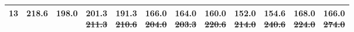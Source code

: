 \begin{tabular}{rccccccccccc}
13 & 218.6 & 198.0 & \shortstack{\textbf{201.3}\\{\tiny\sout{211.3}}} & \shortstack{\textbf{191.3}\\{\tiny\sout{210.6}}} & \shortstack{\textbf{166.0}\\{\tiny\sout{204.0}}} & \shortstack{\textbf{164.0}\\{\tiny\sout{203.3}}} & \shortstack{\textbf{160.0}\\{\tiny\sout{220.6}}} & \shortstack{\textbf{152.0}\\{\tiny\sout{214.0}}} & \shortstack{\textbf{154.6}\\{\tiny\sout{240.6}}} & \shortstack{\textbf{168.0}\\{\tiny\sout{224.0}}} & \shortstack{\textbf{166.0}\\{\tiny\sout{274.0}}} \\[2pt]
\bottomrule
\end{tabular}
